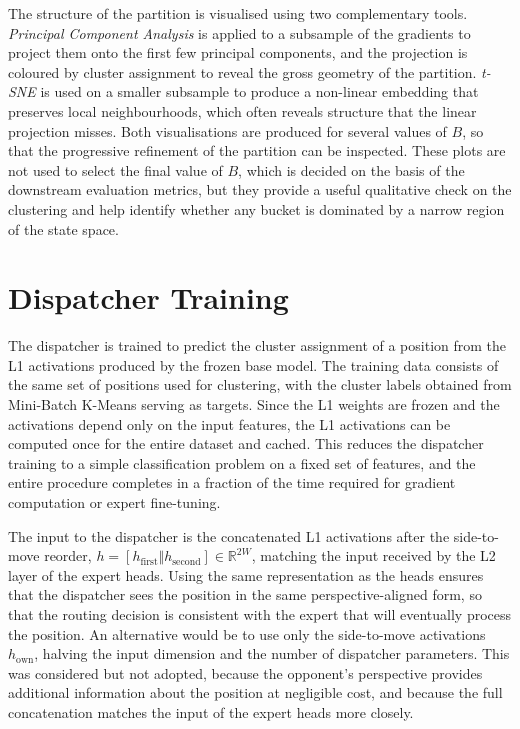 The structure of the partition is visualised using two complementary tools. \emph{Principal Component Analysis} is applied to a subsample of the gradients to project them onto the first few principal components, and the projection is coloured by cluster assignment to reveal the gross geometry of the partition. \emph{t-SNE} is used on a smaller subsample to produce a non-linear embedding that preserves local neighbourhoods, which often reveals structure that the linear projection misses. Both visualisations are produced for several values of \(B\), so that the progressive refinement of the partition can be inspected. These plots are not used to select the final value of \(B\), which is decided on the basis of the downstream evaluation metrics, but they provide a useful qualitative check on the clustering and help identify whether any bucket is dominated by a narrow region of the state space.

\section{Dispatcher Training}\label{sec:dispatcher-impl}

The dispatcher is trained to predict the cluster assignment of a position from the L1 activations produced by the frozen base model. The training data consists of the same set of positions used for clustering, with the cluster labels obtained from Mini-Batch K-Means serving as targets. Since the L1 weights are frozen and the activations depend only on the input features, the L1 activations can be computed once for the entire dataset and cached. This reduces the dispatcher training to a simple classification problem on a fixed set of features, and the entire procedure completes in a fraction of the time required for gradient computation or expert fine-tuning.

The input to the dispatcher is the concatenated L1 activations after the side-to-move reorder, \(h = [h_{\mathrm{first}} \Vert h_{\mathrm{second}}] \in \mathbb{R}^{2W}\), matching the input received by the L2 layer of the expert heads. Using the same representation as the heads ensures that the dispatcher sees the position in the same perspective-aligned form, so that the routing decision is consistent with the expert that will eventually process the position. An alternative would be to use only the side-to-move activations \(h_{\mathrm{own}}\), halving the input dimension and the number of dispatcher parameters. This was considered but not adopted, because the opponent's perspective provides additional information about the position at negligible cost, and because the full concatenation matches the input of the expert heads more closely.


